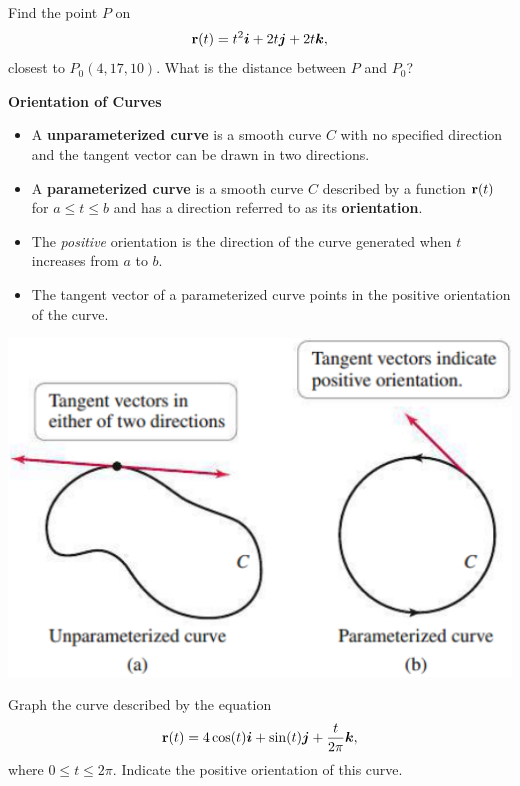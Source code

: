 \documentclass[mathNotesPreamble]{subfiles}
\begin{document}
  \begin{ex*}
    Find the point $P$ on 
      \[{\mathbf{r}}(t)=t^2{\bm{i}}+2t{\bm{j}}+2t{\bm{k}},\]
    closest to $P_0(4,17,10)$. What is the distance between $P$ and $P_0$?
  \end{ex*}
  \pagebreak

  \textbf{Orientation of Curves}\\
  \begin{itemize}
    \item A \textbf{unparameterized curve} is a smooth curve $C$ with no specified direction and the tangent vector can be drawn in two directions.
    \item A \textbf{parameterized curve} is a smooth curve $C$ described by a function ${\mathbf{r}}(t)$ for $a\leq t\leq b$ and has a direction referred to as its \textbf{orientation}.
    \item The \textit{positive} orientation is the direction of the curve generated when $t$ increases from $a$ to $b$. 
    \item The tangent vector of a parameterized curve points in the positive orientation of the curve.
  \end{itemize}
  \begin{center}
    \includegraphics[width=0.65\linewidth]{images/briggs_14_01/fig14_03}
  \end{center}
  \pagebreak

  \begin{ex*}
    Graph the curve described by the equation
      \[{\mathbf{r}}(t)=4\cos(t){\bm{i}}+\sin(t){\bm{j}}+\frac{t}{2\pi}{\bm{k}},\]
    where $0\leq t\leq 2\pi$. Indicate the positive orientation of this curve.
  \end{ex*}
  \pagebreak
\end{document}

